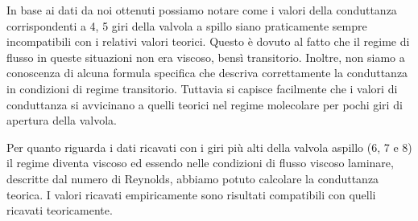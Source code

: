 
In base ai dati da noi ottenuti possiamo notare come i valori della conduttanza corrispondenti a 4, 5 giri della valvola a spillo siano praticamente sempre incompatibili con i relativi valori teorici. Questo è dovuto al fatto che il regime di flusso in queste situazioni non era viscoso, bensì transitorio. Inoltre, non siamo a conoscenza di alcuna formula specifica che descriva correttamente la conduttanza in condizioni di regime transitorio.
Tuttavia si capisce facilmente che i valori di conduttanza si avvicinano a quelli teorici nel regime molecolare per pochi giri di apertura della valvola.

Per quanto riguarda i dati ricavati con i giri più alti della valvola  aspillo (6, 7 e 8) il regime diventa viscoso ed essendo nelle condizioni di flusso viscoso laminare, descritte dal numero di Reynolds, abbiamo potuto calcolare la conduttanza teorica. I valori ricavati empiricamente sono risultati compatibili con quelli ricavati teoricamente. %

